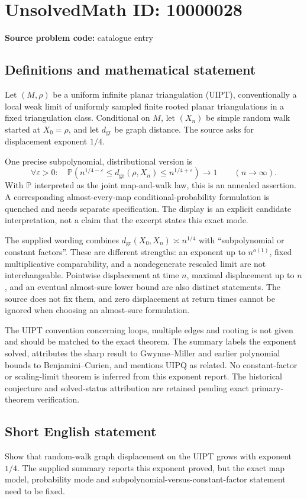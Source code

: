 \documentclass[11pt]{article}
\begin{document}
\section*{UnsolvedMath ID: 10000028}
\textbf{Source problem code:} catalogue entry
\subsection{Definitions and mathematical statement}
Let \((M,\rho)\) be a uniform infinite planar triangulation (UIPT), conventionally a local weak limit of uniformly sampled finite rooted planar triangulations in a fixed triangulation class. Conditional on \(M\), let \((X_n)\) be simple random walk started at \(X_0=\rho\), and let \(d_{\mathrm{gr}}\) be graph distance. The source asks for displacement exponent \(1/4\).

One precise subpolynomial, distributional version is
\[
 \forall\varepsilon>0:\quad
 \mathbb P\left(n^{1/4-\varepsilon}\le
 d_{\mathrm{gr}}(\rho,X_n)\le n^{1/4+\varepsilon}\right)
 \longrightarrow1\qquad(n\to\infty).
\]
With \(\mathbb P\) interpreted as the joint map-and-walk law, this is an annealed assertion. A corresponding almost-every-map conditional-probability formulation is quenched and needs separate specification. The display is an explicit candidate interpretation, not a claim that the excerpt states this exact mode.

The supplied wording combines \(d_{\mathrm{gr}}(X_0,X_n)\asymp n^{1/4}\) with ``subpolynomial or constant factors''. These are different strengths: an exponent up to \(n^{o(1)}\), fixed multiplicative comparability, and a nondegenerate rescaled limit are not interchangeable. Pointwise displacement at time \(n\), maximal displacement up to \(n\), and an eventual almost-sure lower bound are also distinct statements. The source does not fix them, and zero displacement at return times cannot be ignored when choosing an almost-sure formulation.

The UIPT convention concerning loops, multiple edges and rooting is not given and should be matched to the exact theorem. The summary labels the exponent solved, attributes the sharp result to Gwynne--Miller and earlier polynomial bounds to Benjamini--Curien, and mentions UIPQ as related. No constant-factor or scaling-limit theorem is inferred from this exponent report. The historical conjecture and solved-status attribution are retained pending exact primary-theorem verification.
\subsection{Short English statement}
Show that random-walk graph displacement on the UIPT grows with exponent \(1/4\). The supplied summary reports this exponent proved, but the exact map model, probability mode and subpolynomial-versus-constant-factor statement need to be fixed.
\end{document}
